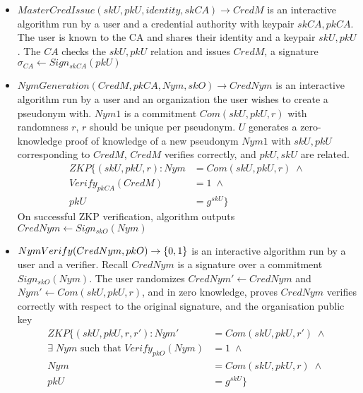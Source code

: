 \begin{itemize}
    \item \textbf{$MasterCredIssue(skU, pkU, identity, skCA) \to CredM$} is an interactive algorithm run by a user and a credential authority with keypair $skCA, pkCA$. The user is known to the CA and shares their identity and a keypair $skU, pkU$. The $CA$ checks the $skU, pkU$ relation and issues $CredM$, a signature $\sigma_{CA} \gets Sign_{skCA}(pkU)$
    
    \item \textbf{$NymGeneration(CredM, pkCA, Nym, skO) \to CredNym$} is an interactive algorithm run by a user and an organization the user wishes to create a pseudonym with. 
    $Nym1$ is a commitment $Com(skU, pkU, r)$ with randomness $r$, $r$ should be unique per pseudonym. 
    $U$ generates a zero-knowledge proof of knowledge of a new pseudonym $Nym1$ with $skU, pkU$ corresponding to $CredM$, $CredM$ verifies correctly, and $pkU, skU$ are related. 
    \[
    \begin{aligned}
    ZKP
    \{ 
        (skU, pkU, r): Nym &= Com(skU, pkU, r) \; \wedge \\
        Verify_{pkCA}(CredM) &= 1 \; \wedge \\ 
        pkU &= g^{skU}
     \}
    \end{aligned}
    \]
    On successful ZKP verification, algorithm outputs $CredNym \gets Sign_{skO}(Nym)$

    \item \textbf{$NymVerify(CredNym, pkO) \to \{0,1\} $} is an interactive algorithm run by a user and a verifier. Recall $CredNym$ is a signature over a commitment $Sign_{skO}(Nym)$. The user randomizes $CredNym' \gets CredNym$ and $Nym' \gets Com(skU, pkU, r)$, and in zero knowledge, proves $CredNym$ verifies correctly with respect to the original signature, and the organisation public key
        \[
        \begin{aligned}
        ZKP
        \{  
            (skU, pkU, r, r'): Nym' &= Com(skU, pkU, r') \; \wedge \\
            \exists \; Nym \text{ such that } Verify_{pkO}(Nym) &= 1 \; \wedge \\ 
            Nym &= Com(skU, pkU, r) \; \wedge \\
            pkU &= g^{skU}
        \}
        \end{aligned}
        \]
\end{itemize}




\newpage
